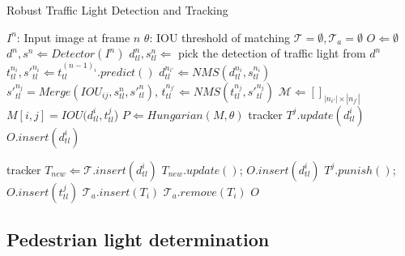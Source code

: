 \begin{algorithm}[h]
\caption{Robust Traffic Light Detection and Tracking} 
\label{alg:traffic_light}
\begin{algorithmic}[1]
\State $I^n$: Input image at frame $n$
\State $\theta$: IOU threshold of matching
\State $\mathcal{T} = \emptyset, \mathcal{T}_a = \emptyset$ 
\State $O \Leftarrow \emptyset$
\State $d^{n}, s^{n} \Leftarrow Detector(I^n)$
\State $d_{tl}^{n}, s_{tl}^{n} \Leftarrow$ pick the detection of traffic light from $d^{n}$
{} 
\State $t_{tl}^{n_i}, {s'}_{tl}^{n_i} \Leftarrow  t_{tl}^{(n-1)_i}.predict()$
\EndFor 
\State $d_{tl}^{n_{i'}} \Leftarrow NMS(d_{tl}^{n_i}, s_{tl}^{n_i})$
\State ${s'}_{tl}^{n_{j}} = Merge(IOU_{ij}, s_{tl}^n, {s'}_{tl}^n)$, $t_{tl}^{n_{j'}} \Leftarrow NMS(t_{tl}^{n_j}, {s'}_{tl}^{n_j})$
\State $\mathcal{M} \Leftarrow []_{|n_{i'}| \times |n_{j'}|}$
\State $M[i, j] = IOU(d_{tl}^i, t_{tl}^j$)
\EndFor
\EndFor
\State $ P \Leftarrow Hungarian(M, \theta)$
\State tracker $T^j.update(d_{tl}^i)$
\State $O.insert(d_{tl}^i)$
\EndFor

\State tracker $ T_{new} \Leftarrow \mathcal{T}.insert(d_{tl}^i)$
\State $T_{new}.update()$; $O.insert(d_{tl}^i)$
\EndFor
{}
\State $T^j.punish()$; $O.insert(t_{tl}^j)$
\EndFor
{}
\State $\mathcal{T}_a.insert(T_i)$ 
\EndIf
{}
\State $\mathcal{T}_a.remove(T_i)$
\EndIf
\EndFor
\Return $O$
\EndProcedure
\end{algorithmic}
\end{algorithm}

\subsection{Pedestrian light determination}

